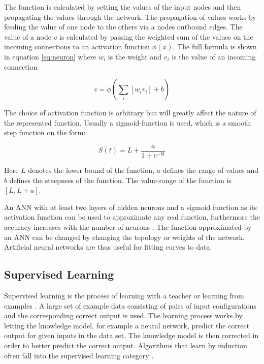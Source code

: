 The function is calculated by setting the values of the input nodes and then propagating the values through the network. The propagation of values works by feeding the value of one node to the others via a nodes outbound edges. The value of a node $v$ is calculated by passing the weighted sum of the values on the incoming connections to an activation function $\phi(x)$. The full formula is shown in equation \ref{eq:neuron} where $w_i$ is the weight and $v_i$ is the value of an incoming connection 

\begin{equation}
    v = \phi (\sum_i{[w_i v_i]} + b)
    \label{eq:neuron}
\end{equation}


\noindent

The choice of activation function is arbitrary but will greatly affect the nature of the represented function. Usually a sigmoid-function is used, which is a smooth step function on the form:

\begin{equation}
    S(t) = L + \frac{a}{1 + e^{-bt}}
\end{equation}

\noindent
Here $L$ denotes the lower bound of the function, $a$ defines the range of values and $b$ defines the steepness of the function. The value-range of the function is $[L, L+a]$. 

An ANN with at least two layers of hidden neurons and a sigmoid function as its activation function can be used to approximate any real function, furthermore the accuracy increases with the number of neurons \cite{mitchel:approximation}. The function approximated by an ANN can be changed by changing the topology or weights of the network. Artificial neural networks are thus useful for fitting curves to data. 



\subsection{Supervised Learning}
Supervised learning is the process of learning with a teacher or learning from examples \cite{haykin:supervised}. A large set of example data consisting of pairs of input configurations and the corresponding correct output is used. The learning process works by letting the knowledge model, for example a neural network, predict the correct output for given inputs in the data set. The knowledge model is then corrected in order to better predict the correct output. Algorithms that learn by induction often fall into the supervised learning category \cite{glossary}. 

